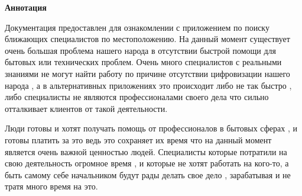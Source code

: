\newpage
\pagestyle{plain}

{
\begin{center}
    \Large
    \textbf{Аннотация}
\end{center}

Документация предоставлен для ознакомлении с приложением по поиску ближающих специалистов  по местоположению. На данный момент существует очень большая проблема нашего народа в отсутствии быстрой помощи для бытовых или технических проблем. Очень много специалистов с реальными знаниями не могут найти работу по причине отсутствии цифровизации нашего народа , а в альтернативных приложениях это происходит либо не так быстро , либо специалисты не являются профессионалами своего дела что сильно отталкивает клиентов от такой деятельности.


Люди готовы и хотят получать помощь от профессионалов в бытовых сферах , и готовы платить за это ведь это сохраняет их время что на данный момент является очень важной ценностью людей. Специалисты которые потратили на свою деятельность огромное время , и которые не хотят работать на кого-то, а быть самому себе начальником будут рады делать свое дело , зарабатывая и не тратя много время на это.
}
